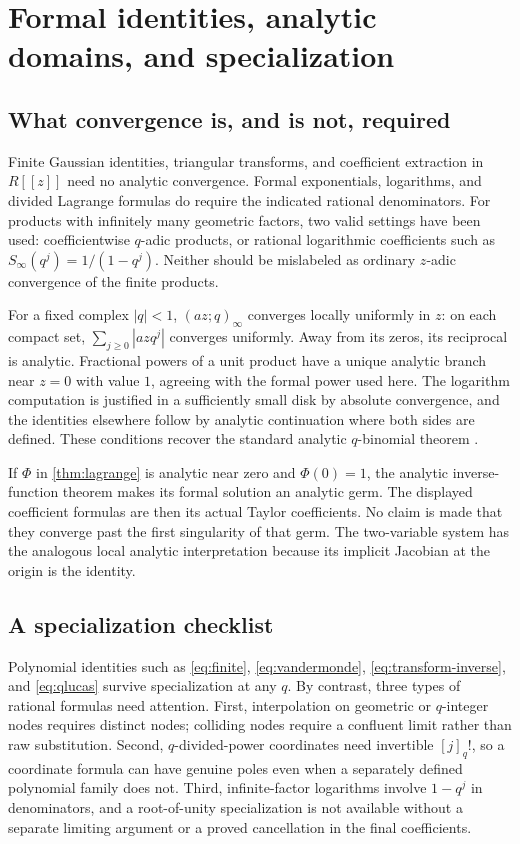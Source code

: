 \documentclass[11pt,a4paper]{article}
\numberwithin{equation}{section}
\theoremstyle{definition}
\theoremstyle{remark}
\newcommand{\qf}[1]{[#1]_{q}!}
\newcommand{\poch}[3]{(#1;#2)_{#3}}
\begin{document}
\section{Formal identities, analytic domains, and specialization}\label{sec:analytic}

\subsection{What convergence is, and is not, required}
Finite Gaussian identities, triangular transforms, and coefficient extraction in
$R[[z]]$ need no analytic convergence. Formal exponentials, logarithms, and divided
Lagrange formulas do require the indicated rational denominators. For products
with infinitely many geometric factors, two valid settings have been used:
coefficientwise $q$-adic products, or rational logarithmic coefficients such as
$S_\infty(q^j)=1/(1-q^j)$. Neither should be mislabeled as ordinary $z$-adic
convergence of the finite products.

For a fixed complex $|q|<1$, $\poch{az}q\infty$ converges locally uniformly in
$z$: on each compact set, $\sum_{j\ge0}|azq^j|$ converges uniformly. Away from its
zeros, its reciprocal is analytic. Fractional powers of a unit product have a
unique analytic branch near $z=0$ with value $1$, agreeing with the formal power
used here. The logarithm computation is justified in a sufficiently small disk
by absolute convergence, and the identities elsewhere follow by analytic
continuation where both sides are defined. These conditions recover the standard
analytic $q$-binomial theorem \cite{DLMF17,DLMF175}.

If $\Phi$ in \cref{thm:lagrange} is analytic near zero and $\Phi(0)=1$, the
analytic inverse-function theorem makes its formal solution an analytic germ.
The displayed coefficient formulas are then its actual Taylor coefficients.
No claim is made that they converge past the first singularity of that germ.
The two-variable system has the analogous local analytic interpretation because
its implicit Jacobian at the origin is the identity.

\subsection{A specialization checklist}
Polynomial identities such as \eqref{eq:finite}, \eqref{eq:vandermonde},
\eqref{eq:transform-inverse}, and \eqref{eq:qlucas} survive specialization at any
$q$. By contrast, three types of rational formulas need attention.
First, interpolation on geometric or $q$-integer nodes requires distinct nodes;
colliding nodes require a confluent limit rather than raw substitution.
Second, $q$-divided-power coordinates need invertible $\qf j$, so a coordinate
formula can have genuine poles even when a separately defined polynomial family
does not. Third, infinite-factor logarithms involve $1-q^j$ in denominators,
and a root-of-unity specialization is not available without a separate limiting
argument or a proved cancellation in the final coefficients.
\end{document}
